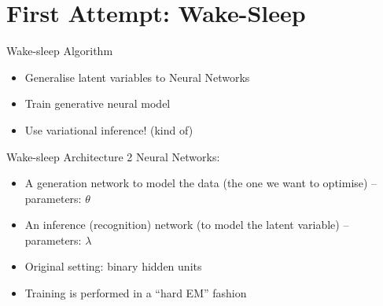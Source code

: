 \documentclass[14pt]{beamer}
\begin{document}
\begin{comment}  %
\begin{frame}{Recap: Variational Inference}
\begin{block}{Objective}
\begin{equation*}
\underset{q(z)}{\max}~\E{\log p(x,z)} + \Ent{q(z)}
\end{equation*}
\begin{itemize}
\item The ELBO is a lower bound on $ \log p(x) $
\item Mean field assumption: $ q(z) = \prod_{i=1}^{N}q(z_{i}) $
\end{itemize}
\end{block}
\end{frame}
\end{comment}


\section{First Attempt: Wake-Sleep}
\frame{\tableofcontents[currentsection]}

\begin{frame}{Wake-sleep Algorithm}
\begin{itemize}
\item Generalise latent variables to Neural Networks
\item Train generative neural model
\item Use variational inference! (kind of)
\end{itemize}
\end{frame}

\begin{frame}{Wake-sleep Architecture}
2 Neural Networks:
\begin{itemize}
\pause
\item A generation network to model the data (the one we want to optimise) -- parameters: $ \theta $
\pause
\item An inference (recognition) network (to model the latent variable) -- parameters: $ \lambda $
\pause
\item Original setting: binary hidden units
\pause
\item Training is performed in a ``hard EM'' fashion
\end{itemize}
\end{frame}
\end{document}
